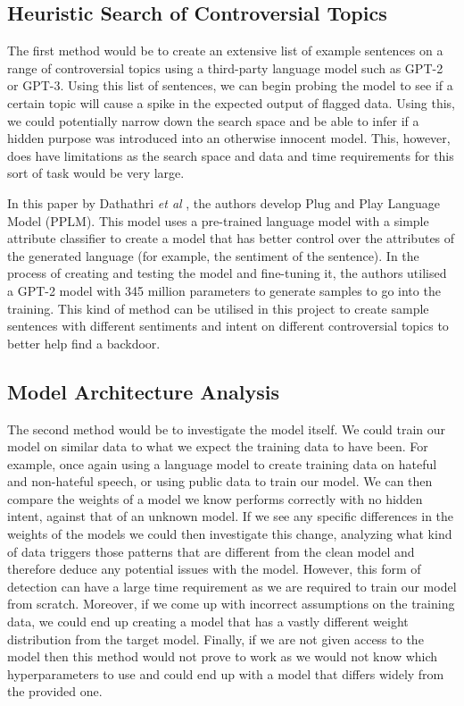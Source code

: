 \subsection{Heuristic Search of Controversial Topics}

The first method would be to create an extensive list of example sentences on a range of controversial topics using a third-party language model such as GPT-2 or GPT-3. Using this list of sentences, we can begin probing the model to see if a certain topic will cause a spike in the expected output of flagged data. Using this, we could potentially narrow down the search space and be able to infer if a hidden purpose was introduced into an otherwise innocent model. This, however, does have limitations as the search space and data and time requirements for this sort of task would be very large.

In this paper by Dathathri \textit{et al} \cite{PlugNPlay}, the authors develop Plug and Play Language Model (PPLM). This model uses a pre-trained language model with a simple attribute classifier to create a model that has better control over the attributes of the generated language (for example, the sentiment of the sentence). In the process of creating and testing the model and fine-tuning it, the authors utilised a GPT-2 model with 345 million parameters \cite{GPT} to generate samples to go into the training. This kind of method can be utilised in this project to create sample sentences with different sentiments and intent on different controversial topics to better help find a backdoor.


\subsection{Model Architecture Analysis}

The second method would be to investigate the model itself. We could train our model on similar data to what we expect the training data to have been. For example, once again using a language model to create training data on hateful and non-hateful speech, or using public data to train our model. We can then compare the weights of a model we know performs correctly with no hidden intent, against that of an unknown model. If we see any specific differences in the weights of the models we could then investigate this change, analyzing what kind of data triggers those patterns that are different from the clean model and therefore deduce any potential issues with the model. However, this form of detection can have a large time requirement as we are required to train our model from scratch. Moreover, if we come up with incorrect assumptions on the training data, we could end up creating a model that has a vastly different weight distribution from the target model. Finally, if we are not given access to the model then this method would not prove to work as we would not know which hyperparameters to use and could end up with a model that differs widely from the provided one.

